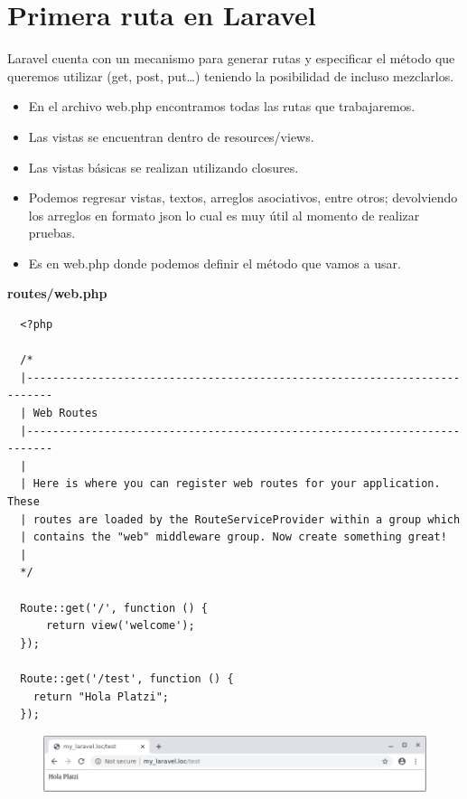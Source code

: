 \documentclass{article}
\begin{document}
\section{Primera ruta en Laravel}%
Laravel cuenta con un mecanismo para generar rutas y especificar el método que
queremos utilizar (get, post, put…) teniendo la posibilidad de incluso
mezclarlos.\\

\begin{itemize}
  \item En el archivo web.php encontramos todas las rutas que trabajaremos.
  \item Las vistas se encuentran dentro de resources/views.
  \item Las vistas básicas se realizan utilizando closures.
  \item Podemos regresar vistas, textos, arreglos asociativos, entre otros;
    devolviendo los arreglos en formato json lo cual es muy útil al momento de
    realizar pruebas.
  \item Es en web.php donde podemos definir el método que vamos a usar.
\end{itemize}


\textbf{routes/web.php}
\begin{verbatim}
  <?php

  /*
  |--------------------------------------------------------------------------
  | Web Routes
  |--------------------------------------------------------------------------
  |
  | Here is where you can register web routes for your application. These
  | routes are loaded by the RouteServiceProvider within a group which
  | contains the "web" middleware group. Now create something great!
  |
  */

  Route::get('/', function () {
      return view('welcome');
  });

  Route::get('/test', function () {
    return "Hola Platzi";
  });
\end{verbatim}


\begin{figure}[h!]
  \centering
  \includegraphics[scale=0.5]{./Pictures/004_test.png}
\end{figure}
\end{document}
